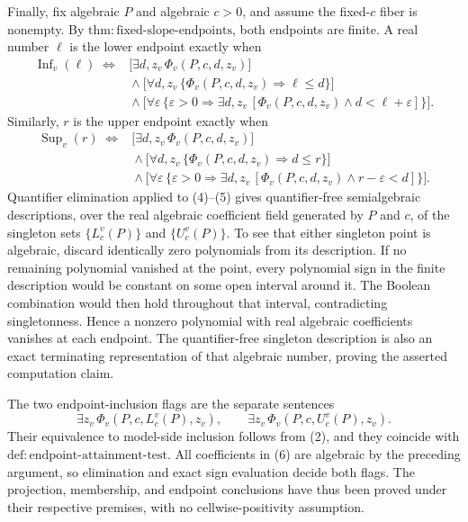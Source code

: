 Finally, fix algebraic \(P\) and algebraic \(c>0\), and assume the fixed-\(c\) fiber is nonempty.  By \(\mathrm{thm{:}fixed\text{-}slope\text{-}endpoints}\), both endpoints are finite.  A real number \(\ell\) is the lower endpoint exactly when
\[
\begin{aligned}
 \operatorname{Inf}_v(\ell)\;\Longleftrightarrow{}&
 \bigl[\exists d,z_v\,\Phi_v(P,c,d,z_v)\bigr]\\
 &{}\wedge\bigl[\forall d,z_v\,
   \{\Phi_v(P,c,d,z_v)\Rightarrow \ell\le d\}\bigr]\\
 &{}\wedge\bigl[\forall\varepsilon\,
   \{\varepsilon>0\Rightarrow
   \exists d,z_v\,[\Phi_v(P,c,d,z_v)\wedge d<\ell+\varepsilon]\}\bigr].
\end{aligned} \tag{4}
\]
Similarly, \(r\) is the upper endpoint exactly when
\[
\begin{aligned}
 \operatorname{Sup}_v(r)\;\Longleftrightarrow{}&
 \bigl[\exists d,z_v\,\Phi_v(P,c,d,z_v)\bigr]\\
 &{}\wedge\bigl[\forall d,z_v\,
   \{\Phi_v(P,c,d,z_v)\Rightarrow d\le r\}\bigr]\\
 &{}\wedge\bigl[\forall\varepsilon\,
   \{\varepsilon>0\Rightarrow
   \exists d,z_v\,[\Phi_v(P,c,d,z_v)\wedge r-\varepsilon<d]\}\bigr].
\end{aligned} \tag{5}
\]
Quantifier elimination applied to (4)--(5) gives quantifier-free semialgebraic descriptions, over the real algebraic coefficient field generated by \(P\) and \(c\), of the singleton sets \(\{L_c^v(P)\}\) and \(\{U_c^v(P)\}\).  To see that either singleton point is algebraic, discard identically zero polynomials from its description.  If no remaining polynomial vanished at the point, every polynomial sign in the finite description would be constant on some open interval around it.  The Boolean combination would then hold throughout that interval, contradicting singletonness.  Hence a nonzero polynomial with real algebraic coefficients vanishes at each endpoint.  The quantifier-free singleton description is also an exact terminating representation of that algebraic number, proving the asserted computation claim.

The two endpoint-inclusion flags are the separate sentences
\[
 \exists z_v\,\Phi_v(P,c,L_c^v(P),z_v),
 \qquad
 \exists z_v\,\Phi_v(P,c,U_c^v(P),z_v). \tag{6}
\]
Their equivalence to model-side inclusion follows from (2), and they coincide with \(\mathrm{def{:}endpoint\text{-}attainment\text{-}test}\).  All coefficients in (6) are algebraic by the preceding argument, so elimination and exact sign evaluation decide both flags.  The projection, membership, and endpoint conclusions have thus been proved under their respective premises, with no cellwise-positivity assumption.

